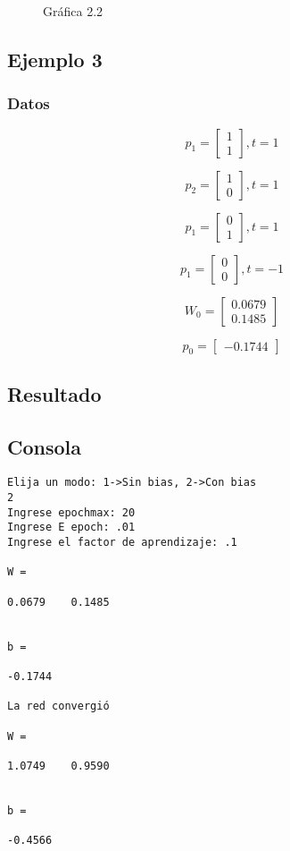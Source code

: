 \documentclass{article}
\begin{document}
\begin{figure}[htpb]
	\centering
	
	\caption{Gráfica 2.2}
\end{figure}
\newpage
\subsection{Ejemplo 3}
\subsubsection{Datos}
\[p_1=
\begin{bmatrix}
1\\
1
\end{bmatrix}
,t = 1
\]

\[p_2=
\begin{bmatrix}
1\\
0
\end{bmatrix}
,t = 1
\]

\[p_1=
\begin{bmatrix}
0\\
1
\end{bmatrix}
,t = 1
\]

\[p_1=
\begin{bmatrix}
0\\
0
\end{bmatrix}
,t = -1
\]

\[W_0=
\begin{bmatrix}
0.0679  \\ 
 0.1485
\end{bmatrix}
\]

\[p_0=
\begin{bmatrix}
-0.1744
\end{bmatrix}
\]
\subsection{Resultado}
\subsection{Consola}
\begin{lstlisting}
Elija un modo: 1->Sin bias, 2->Con bias
2
Ingrese epochmax: 20
Ingrese E epoch: .01
Ingrese el factor de aprendizaje: .1

W =

0.0679    0.1485


b =

-0.1744

La red convergió

W =

1.0749    0.9590


b =

-0.4566
\end{lstlisting}
\end{document}
